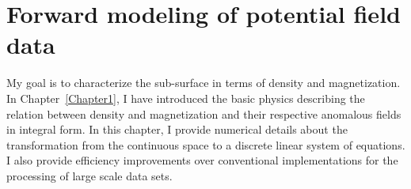 \graphicspath{{./../Figures/}}
\chapter{Forward modeling of potential field data}
\label{Chapter2}
My goal is to characterize the sub-surface in terms of density and magnetization. In Chapter~\ref{Chapter1}, I have introduced the basic physics describing the relation between density and magnetization and their respective anomalous fields in integral form. In this chapter, I provide numerical details about the transformation from the continuous space to a discrete linear system of equations. I also provide efficiency improvements over conventional implementations for the processing of large scale data sets.

